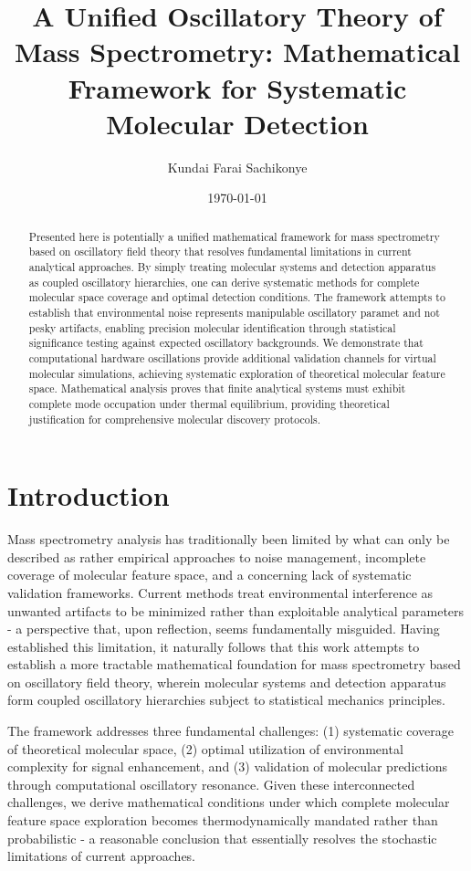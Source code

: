 \documentclass[11pt,a4paper]{article}
\title{A Unified Oscillatory Theory of Mass Spectrometry: Mathematical Framework for Systematic Molecular Detection}
\author{Kundai Farai Sachikonye}
\date{\today}
\begin{document}
\maketitle

\begin{abstract}
Presented here is potentially  a unified mathematical framework for mass spectrometry based on oscillatory field theory that resolves fundamental limitations in current analytical approaches. By simply  treating molecular systems and detection apparatus as coupled oscillatory hierarchies, one can  derive systematic methods for complete molecular space coverage and optimal detection conditions. The framework attempts to  establish that environmental noise represents manipulable oscillatory paramet and not pesky artifacts, enabling precision molecular identification through statistical significance testing against expected oscillatory backgrounds. We demonstrate that computational hardware oscillations provide additional validation channels for virtual molecular simulations, achieving systematic exploration of theoretical molecular feature space. Mathematical analysis proves that finite analytical systems must exhibit complete mode occupation under thermal equilibrium, providing theoretical justification for comprehensive molecular discovery protocols.
\end{abstract}

\section{Introduction}

Mass spectrometry analysis has traditionally been limited by what can only be described as rather empirical approaches to noise management, incomplete coverage of molecular feature space, and a concerning lack of systematic validation frameworks. Current methods treat environmental interference as unwanted artifacts to be minimized rather than exploitable analytical parameters - a perspective that, upon reflection, seems fundamentally misguided. Having established this limitation, it naturally follows that this work attempts to establish a more tractable mathematical foundation for mass spectrometry based on oscillatory field theory, wherein molecular systems and detection apparatus form coupled oscillatory hierarchies subject to statistical mechanics principles.

The framework addresses three fundamental challenges: (1) systematic coverage of theoretical molecular space, (2) optimal utilization of environmental complexity for signal enhancement, and (3) validation of molecular predictions through computational oscillatory resonance. Given these interconnected challenges, we derive mathematical conditions under which complete molecular feature space exploration becomes thermodynamically mandated rather than probabilistic - a reasonable conclusion that essentially resolves the stochastic limitations of current approaches.
\end{document}
